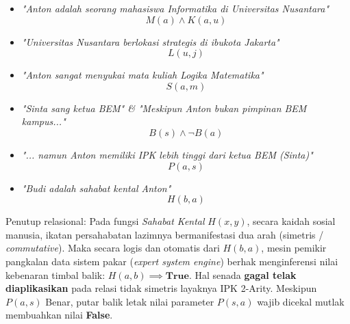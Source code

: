 \begin{itemize}
    \item \textit{"Anton adalah seorang mahasiswa Informatika di Universitas Nusantara"}
    \[ M(a) \land K(a, u) \]
    
    \item \textit{"Universitas Nusantara berlokasi strategis di ibukota Jakarta"}
    \[ L(u, j) \]
    
    \item \textit{"Anton sangat menyukai mata kuliah Logika Matematika"}
    \[ S(a, m) \]
    
    \item \textit{"Sinta sang ketua BEM" \& "Meskipun Anton bukan pimpinan BEM kampus..."}
    \[ B(s) \land \neg B(a) \]
    
    \item \textit{"... namun Anton memiliki IPK lebih tinggi dari ketua BEM (Sinta)"}
    \[ P(a, s) \]
    
    \item \textit{"Budi adalah sahabat kental Anton"}
    \[ H(b, a) \]
\end{itemize}

Penutup relasional: Pada fungsi \textit{Sahabat Kental} $H(x, y)$, secara kaidah sosial manusia, ikatan persahabatan lazimnya bermanifestasi dua arah (simetris / \textit{commutative}). Maka secara logis dan otomatis dari $H(b, a)$, mesin pemikir pangkalan data sistem pakar (\textit{expert system engine}) berhak menginferensi nilai kebenaran timbal balik: $H(a, b) \implies \textbf{True}$. Hal senada \textbf{gagal telak diaplikasikan} pada relasi tidak simetris layaknya IPK 2-Arity. Meskipun $P(a, s)$ Benar, putar balik letak nilai parameter $P(s, a)$ wajib dicekal mutlak membuahkan nilai \textbf{False}. 
